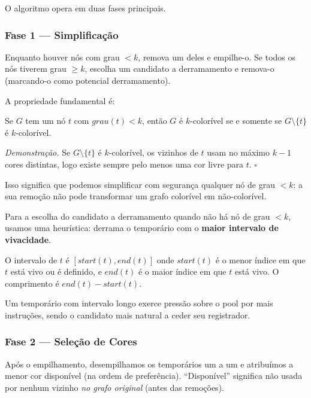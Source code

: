 O algoritmo opera em duas fases principais.

\subsubsection{Fase 1 — Simplificação}

Enquanto houver nós com grau $< k$, remova um deles e empilhe-o.
Se todos os nós tiverem grau $\geq k$, escolha um candidato a
derramamento e remova-o (marcando-o como potencial derramamento).

A propriedade fundamental é:

\begin{Theorem}
  Se $G$ tem um nó $t$ com $\mathit{grau}(t) < k$, então $G$ é
  $k$-colorível se e somente se $G \setminus \{t\}$ é $k$-colorível.
\end{Theorem}

\emph{Demonstração.} Se $G \setminus \{t\}$ é $k$-colorível, os
vizinhos de $t$ usam no máximo $k-1$ cores distintas, logo existe
sempre pelo menos uma cor livre para $t$. \(\square\)

Isso significa que podemos simplificar com segurança qualquer nó de
grau $< k$: a sua remoção não pode transformar um grafo colorível em
não-colorível.

Para a escolha do candidato a derramamento quando não há nó de grau
$< k$, usamos uma heurística: derrama o temporário com o
\textbf{maior intervalo de vivacidade}.

\begin{Definition}
  O intervalo de $t$ é $[\mathit{start}(t), \mathit{end}(t)]$ onde
  $\mathit{start}(t)$ é o menor índice em que $t$ está vivo ou é
  definido, e $\mathit{end}(t)$ é o maior índice em que $t$ está vivo.
  O comprimento é $\mathit{end}(t) - \mathit{start}(t)$.
\end{Definition}

Um temporário com intervalo longo exerce pressão sobre o pool por
mais instruções, sendo o candidato mais natural a ceder seu registrador.

\subsubsection{Fase 2 — Seleção de Cores}

Após o empilhamento, desempilhamos os temporários um a um e atribuímos
a menor cor disponível (na ordem de preferência). ``Disponível'' significa
não usada por nenhum vizinho \emph{no grafo original} (antes das remoções).

